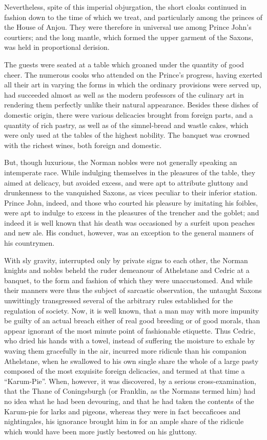 Nevertheless, spite of this imperial objurgation, the short cloaks
continued in fashion down to the time of which we treat, and
particularly among the princes of the House of Anjou. They were
therefore in universal use among Prince John's courtiers; and the long
mantle, which formed the upper garment of the Saxons, was held in
proportional derision.

The guests were seated at a table which groaned under the quantity of
good cheer. The numerous cooks who attended on the Prince's progress,
having exerted all their art in varying the forms in which the ordinary
provisions were served up, had succeeded almost as well as the modern
professors of the culinary art in rendering them perfectly unlike their
natural appearance. Besides these dishes of domestic origin, there were
various delicacies brought from foreign parts, and a quantity of rich
pastry, as well as of the simnel-bread and wastle cakes, which were only
used at the tables of the highest nobility. The banquet was crowned with
the richest wines, both foreign and domestic.

But, though luxurious, the Norman nobles were not generally speaking an
intemperate race. While indulging themselves in the pleasures of the
table, they aimed at delicacy, but avoided excess, and were apt to
attribute gluttony and drunkenness to the vanquished Saxons, as vices
peculiar to their inferior station. Prince John, indeed, and those who
courted his pleasure by imitating his foibles, were apt to indulge to
excess in the pleasures of the trencher and the goblet; and indeed it is
well known that his death was occasioned by a surfeit upon peaches and
new ale. His conduct, however, was an exception to the general manners
of his countrymen.

With sly gravity, interrupted only by private signs to each other, the
Norman knights and nobles beheld the ruder demeanour of Athelstane and
Cedric at a banquet, to the form and fashion of which they were
unaccustomed. And while their manners were thus the subject of sarcastic
observation, the untaught Saxons unwittingly transgressed several of the
arbitrary rules established for the regulation of society. Now, it is
well known, that a man may with more impunity be guilty of an actual
breach either of real good breeding or of good morals, than appear
ignorant of the most minute point of fashionable etiquette. Thus Cedric,
who dried his hands with a towel, instead of suffering the moisture to
exhale by waving them gracefully in the air, incurred more ridicule than
his companion Athelstane, when he swallowed to his own single share the
whole of a large pasty composed of the most exquisite foreign
delicacies, and termed at that time a ``Karum-Pie''. When, however, it
was discovered, by a serious cross-examination, that the Thane of
Coningsburgh (or Franklin, as the Normans termed him) had no idea what
he had been devouring, and that he had taken the contents of the
Karum-pie for larks and pigeons, whereas they were in fact beccaficoes
and nightingales, his ignorance brought him in for an ample share of the
ridicule which would have been more justly bestowed on his gluttony.

